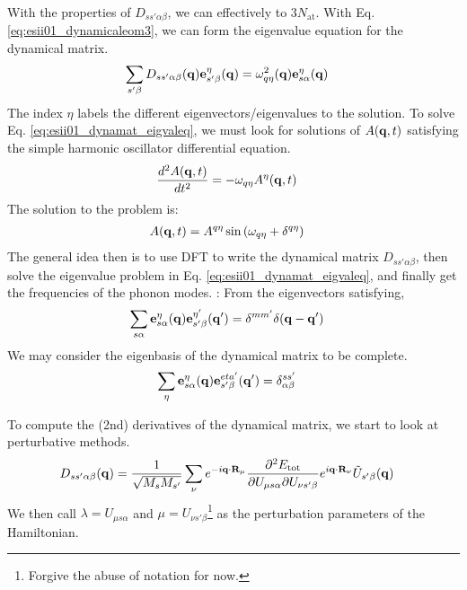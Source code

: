 With the properties of $D_{ss'\alpha\beta}$, we can effectively  to $3N_\text{at}$. With Eq. \ref{eq:esii01_dynamicaleom3}, we can form the eigenvalue equation for the dynamical matrix.
\begin{align}
    \sum_{s'\beta} D_{ss'\alpha\beta}(\mathbf{q})\mathbf{e}_{s'\beta}^\eta(\mathbf{q}) &= \omega_{q\eta}^2(\mathbf{q})\mathbf{e}_{s\alpha}^\eta(\mathbf{q})
    \label{eq:esii01_dynamat_eigvaleq}
\end{align}
The index $\eta$ labels the different eigenvectors/eigenvalues to the solution. To solve Eq. \ref{eq:esii01_dynamat_eigvaleq}, we must look for solutions of $A(\mathbf{q},t)$ satisfying the simple harmonic oscillator differential equation.
\begin{align}
    \frac{d^2A(\mathbf{q},t)}{dt^2} &= -\omega_{q\eta}A^\eta(\mathbf{q},t) \label{eq:esii01_A_sho}
\end{align}
The solution to the problem is:
\begin{align}
    A(\mathbf{q},t) &= A^{q\eta}\sin\left(\omega_{q\eta}+\delta^{q\eta}\right) \label{eq:esii01_A_sho_sol}
\end{align}
The general idea then is to use DFT to write the dynamical matrix $D_{ss'\alpha\beta}$, then solve the eigenvalue problem in Eq. \ref{eq:esii01_dynamat_eigvaleq}, and finally get the frequencies of the phonon modes. : From the eigenvectors satisfying,
\begin{align}
    \sum_{s\alpha} \mathbf{e}^\eta_{s\alpha}(\mathbf{q}) \mathbf{e}^{\eta'}_{s'\beta}(\mathbf{q'
    }) &= \delta^{mm'}\delta(\mathbf{q}-\mathbf{q'})
\end{align}
We may consider the eigenbasis of the dynamical matrix to be complete.
\begin{align}
    \sum_{\eta} \mathbf{e}^\eta_{s\alpha}(\mathbf{q}) \mathbf{e}^{eta'}_{s'\beta}(\mathbf{q'
    }) &= \delta^{ss'}_{\alpha\beta}
\end{align}

To compute the (2nd) derivatives of the dynamical matrix, we start to look at perturbative methods.
\begin{align*}
    D_{ss'\alpha\beta}(\mathbf{q}) &= \frac{1}{\sqrt{M_sM_{s'}}} \sum_\nu e^{-i\mathbf{q}\cdot\mathbf{R}_\mu}\frac{\partial^2E_\text{tot}}{\partial U_{\mu s\alpha} \partial U_{\nu s'\beta}}e^{i\mathbf{q}\cdot\mathbf{R}_\nu}\tilde{U}_{s'\beta}(\mathbf{q}) 
\end{align*}
We then call $\lambda=U_{\mu s\alpha}$ and $\mu=U_{\nu s'\beta}$\footnote{Forgive the abuse of notation for now.} as the perturbation parameters of the Hamiltonian. 

